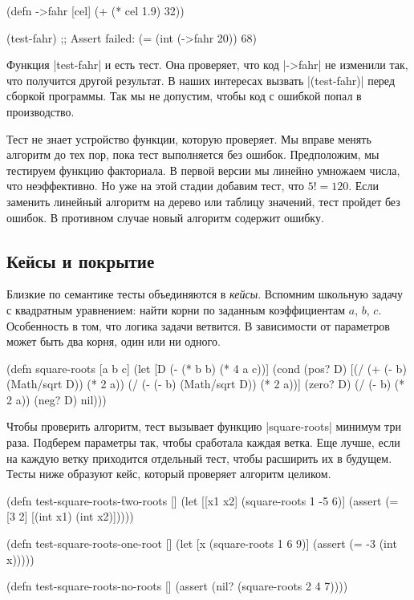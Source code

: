 \begin{english}
  \begin{clojure}
(defn ->fahr [cel]
  (+ (* cel 1.9) 32))

(test-fahr)
;; Assert failed: (= (int (->fahr 20)) 68)
  \end{clojure}
\end{english}

Функция \spverb|test-fahr| и есть тест. Она проверяет, что код \spverb|->fahr|
не изменили так, что получится другой результат. В наших интересах вызвать
\spverb|(test-fahr)| перед сборкой программы. Так мы не допустим, чтобы код с
ошибкой попал в производство.

Тест не знает устройство функции, которую проверяет. Мы вправе менять алгоритм
до тех пор, пока тест выполняется без ошибок. Предположим, мы тестируем функцию
факториала. В первой версии мы линейно умножаем числа, что неэффективно. Но уже
на этой стадии добавим тест, что $5! = 120$. Если заменить линейный алгоритм на
дерево или таблицу значений, тест пройдет без ошибок. В противном случае новый
алгоритм содержит ошибку.

\subsection{Кейсы и покрытие}

Близкие по семантике тесты объединяются в \emph{кейсы}. Вспомним школьную задачу
с квадратным уравнением: найти корни по заданным коэффициентам $a$, $b$,
$c$. Особенность в том, что логика задачи ветвится. В зависимости от параметров
может быть два корня, один или ни одного.

\begin{english}
  \begin{clojure}
(defn square-roots [a b c]
  (let [D (- (* b b) (* 4 a c))]
    (cond
      (pos? D) [(/ (+ (- b) (Math/sqrt D)) (* 2 a))
                (/ (- (- b) (Math/sqrt D)) (* 2 a))]
      (zero? D) (/ (- b) (* 2 a))
      (neg? D) nil)))
  \end{clojure}
\end{english}

Чтобы проверить алгоритм, тест вызывает функцию \spverb|square-roots| минимум
три раза. Подберем параметры так, чтобы сработала каждая ветка. Еще лучше, если
на каждую ветку приходится отдельный тест, чтобы расширить их в будущем. Тесты
ниже образуют кейс, который проверяет алгоритм целиком.

\begin{english}
  \begin{clojure}
(defn test-square-roots-two-roots []
  (let [[x1 x2] (square-roots 1 -5 6)]
    (assert (= [3 2] [(int x1) (int x2)]))))

(defn test-square-roots-one-root []
  (let [x (square-roots 1 6 9)]
    (assert (= -3 (int x)))))

(defn test-square-roots-no-roots []
  (assert (nil? (square-roots 2 4 7))))
  \end{clojure}
\end{english}

